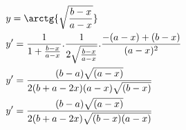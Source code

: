 \begin{ex}
\begin{align}
&y=\arctg{\sqrt{\frac{b-x}{a-x}}}\nonumber\\
&y'=\frac{1}{1+\frac{b-x}{a-x}}.\frac{1}{2\sqrt{\frac{b-x}{a-x}}}.\frac{-(a-x)+(b-x)}{(a-x)^2}\nonumber\\
&y'=\frac{(b-a)\sqrt{(a-x)}}{2(b+a-2x)(a-x)\sqrt{(b-x)}}\nonumber\\
&y'=\frac{(b-a)\sqrt{(a-x)}}{2(b+a-2x)\sqrt{(b-x)(a-x)}}\nonumber
\end{align}
\end{ex}